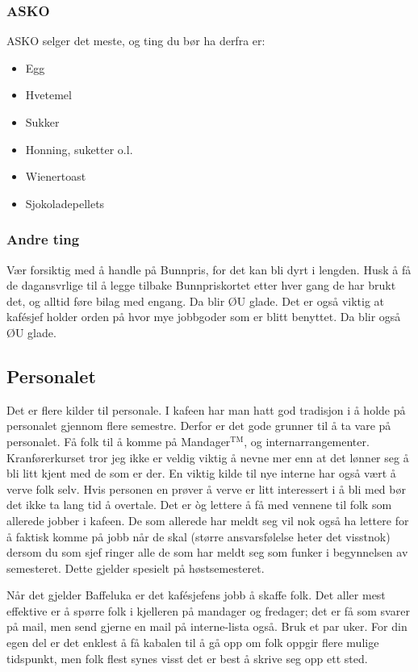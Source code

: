 \subsubsection{ASKO}
ASKO selger det meste, og ting du bør ha derfra er:
\begin{itemize}
    \item Egg
    \item Hvetemel
    \item Sukker
    \item Honning, suketter o.l.
    \item Wienertoast
    \item Sjokoladepellets
\end{itemize}


\subsubsection{Andre ting} Vær forsiktig med å handle på Bunnpris, for det kan
bli dyrt i lengden. Husk å få de dagansvrlige til å legge tilbake Bunnpriskortet
etter hver gang de har brukt det, og alltid føre bilag med engang. Da blir ØU
glade. Det er også viktig at kafésjef holder orden på hvor mye jobbgoder som er
blitt benyttet. Da blir også ØU glade.

\subsection{Personalet} Det er flere kilder til personale. I kafeen har man hatt
god tradisjon i å holde på personalet gjennom flere semestre. Derfor er det gode
grunner til å ta vare på personalet. Få folk til å komme på
Mandager$^\text{TM}$, og internarrangementer.  Kranførerkurset tror jeg ikke er
veldig viktig å nevne mer enn at det lønner seg å bli litt kjent med de som er
der. En viktig kilde til nye interne har også vært å verve folk selv. Hvis
personen en prøver å verve er litt interessert i å bli med bør det ikke ta lang
tid å overtale. Det er \`og lettere å få med vennene til folk som allerede
jobber i kafeen. De som allerede har meldt seg vil nok også ha lettere for å
faktisk komme på jobb når de skal (større ansvarsfølelse heter det visstnok)
dersom du som sjef ringer alle de som har meldt seg som funker i begynnelsen av
semesteret. Dette gjelder spesielt på høstsemesteret.

Når det gjelder Baffeluka er det kaf\'esjefens jobb å skaffe folk. Det aller
mest effektive er å spørre folk i kjelleren på mandager og fredager; det er få
som svarer på mail, men send gjerne en mail på interne-lista også. Bruk et par
uker. For din egen del er det enklest å få kabalen til å gå opp om folk oppgir
flere mulige tidspunkt, men folk flest synes visst det er best å skrive seg opp
ett sted.

